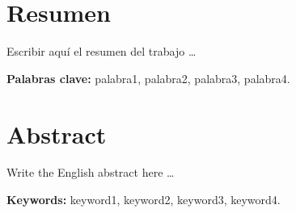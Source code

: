 \chapter*{Resumen}

Escribir aquí el resumen del trabajo \dots

\vspace{0.5cm}
\noindent\textbf{Palabras clave:} palabra1, palabra2, palabra3, palabra4.

\bigskip

\chapter*{Abstract}

Write the English abstract here \dots

\vspace{0.5cm}
\noindent\textbf{Keywords:} keyword1, keyword2, keyword3, keyword4.
